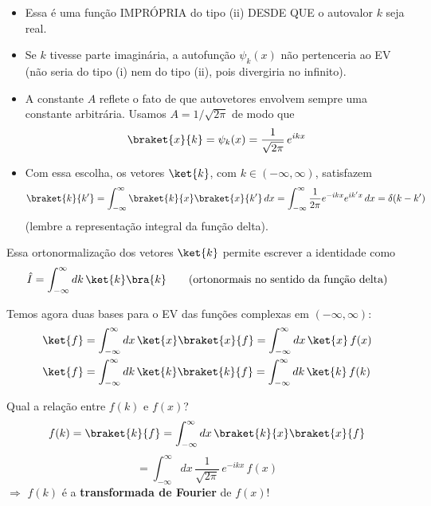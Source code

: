 \begin{itemize}
\item Essa é uma função IMPRÓPRIA do tipo (ii) DESDE QUE o autovalor $k$ seja real.
\item Se $k$ tivesse parte imaginária, a autofunção $\psi_k(x)$ não pertenceria ao EV (não seria do tipo (i) nem do tipo (ii), pois divergiria no infinito).
\item A constante $A$ reflete o fato de que autovetores envolvem sempre uma constante arbitrária. Usamos $A = 1/\sqrt{2\pi}$ de modo que
\begin{equation}
\braket{x}{k} = \psi_k(x) = \frac{1}{\sqrt{2\pi}}\,e^{ikx}
\label{eq:aula7_K_autofuncao_normalizada}
\end{equation}
\item Com essa escolha, os vetores $\ket{k}$, com $k \in (-\infty,\infty)$, satisfazem
\begin{equation}
\braket{k}{k'} = \int_{-\infty}^{\infty}\braket{k}{x}\braket{x}{k'}\,dx = \int_{-\infty}^{\infty}\frac{1}{2\pi}e^{-ikx}e^{ik'x}\,dx = \delta(k-k')
\label{eq:aula7_K_ortonormalizacao}
\end{equation}
(lembre a representação integral da função delta).
\end{itemize}

Essa ortonormalização dos vetores $\ket{k}$ permite escrever a identidade como
\begin{equation}
\hat{I} = \int_{-\infty}^{\infty} dk\,\ket{k}\bra{k} \qquad \text{(ortonormais no sentido da função delta)}
\label{eq:aula7_identidade_k}
\end{equation}

Temos agora duas bases para o EV das funções complexas em $(-\infty,\infty)$:
\begin{align}
\ket{f} &= \int_{-\infty}^{\infty} dx\,\ket{x}\braket{x}{f} = \int_{-\infty}^{\infty} dx\,\ket{x}\,f(x) \label{eq:aula7_base_x} \\
\ket{f} &= \int_{-\infty}^{\infty} dk\,\ket{k}\braket{k}{f} = \int_{-\infty}^{\infty} dk\,\ket{k}\,f(k) \label{eq:aula7_base_k}
\end{align}

Qual a relação entre $f(k)$ e $f(x)$?
\begin{equation}
f(k) = \braket{k}{f} = \int_{-\infty}^{\infty} dx\,\braket{k}{x}\braket{x}{f}
\label{eq:aula7_fk_def}
\end{equation}
\begin{equation}
= \int_{-\infty}^{\infty} dx\,\frac{1}{\sqrt{2\pi}}\,e^{-ikx}\,f(x)
\label{eq:aula7_fk_integral}
\end{equation}
$\Rightarrow$ $f(k)$ é a \textbf{transformada de Fourier} de $f(x)$!

